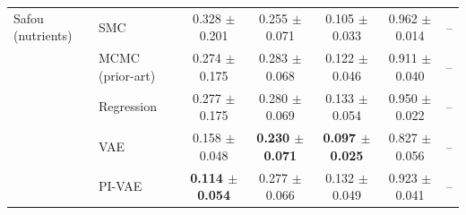 \begin{table}[t]
\begin{tabular}{ll ccccc}
\midrule
Safou (nutrients) & SMC & 0.328 $\pm$ 0.201 & 0.255 $\pm$ 0.071 & 0.105 $\pm$ 0.033 & 0.962 $\pm$ 0.014 & -- \\
 & MCMC (prior-art) & 0.274 $\pm$ 0.175 & 0.283 $\pm$ 0.068 & 0.122 $\pm$ 0.046 & 0.911 $\pm$ 0.040 & -- \\
 & Regression & 0.277 $\pm$ 0.175 & 0.280 $\pm$ 0.069 & 0.133 $\pm$ 0.054 & 0.950 $\pm$ 0.022 & -- \\
 & VAE & 0.158 $\pm$ 0.048 & \textbf{0.230 $\pm$ 0.071} & \textbf{0.097 $\pm$ 0.025} & 0.827 $\pm$ 0.056 & -- \\
 & PI-VAE & \textbf{0.114 $\pm$ 0.054} & 0.277 $\pm$ 0.066 & 0.132 $\pm$ 0.049 & 0.923 $\pm$ 0.041 & -- \\
\bottomrule
\end{tabular}
\end{table}
